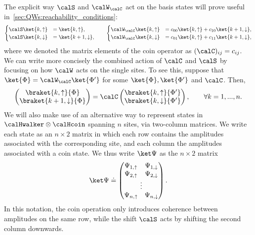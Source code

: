 The explicit way $\calS$ and $\calW_\calC$ act on the basis states will prove useful in~\cref{sec:QWs:reachability_conditions}:
\begin{equation}
\begin{cases}
    \calS\ket{k,\uparrow} &= \ket{k,\uparrow}, \\
    \calS\ket{k,\downarrow} &= \ket{k+1, \downarrow},
\end{cases}
\qquad
\begin{cases}
    \calW_\calC\ket{k,\uparrow} &= c_{00} \ket{k,\uparrow} + c_{10} \ket{k+ 1,\downarrow}, \\
    \calW_\calC\ket{k,\downarrow} &= c_{01}\ket{k, \uparrow} + c_{11} \ket{k+1, \downarrow},
\end{cases}
\end{equation}
where we denoted the matrix elements of the coin operator as $(\calC)_{ij}=c_{ij}$.
We can write more concisely the combined action of $\calC$ and $\calS$ by focusing on how $\calW$ acts on the single sites.
To see this, suppose that $\ket{\Phi}=\calW_\calC\ket{\Phi'}$ for some $\ket{\Phi},\ket{\Phi'}$ and $\calC$.
Then,
\begin{equation}
    \begin{pmatrix}
        \braket{k,\uparrow}{\Phi} \\
        \braket{k + 1, \downarrow}{\Phi}
    \end{pmatrix} =
    \calC \begin{pmatrix}
        \braket{k,\uparrow}{\Phi'} \\
        \braket{k,\downarrow}{\Phi'}
    \end{pmatrix},
    \qquad \forall k=1,...,n.
    \label{eq:QWs:dynamics_on_single_positions}
\end{equation}
We will also make use of an alternative way to represent states in $\calHwalker\otimes\calHcoin$ spanning $n$ sites, via two-column matrices. We write each state as an $n\times 2$ matrix in which each row contains the amplitudes associated with the corresponding site, and each column the amplitudes associated with a coin state.
We thus write $\ket\Psi$ as the $n\times2$ matrix
\begin{equation}
    \ket\Psi\doteq \begin{pmatrix}
        \Psi_{1,\uparrow} & \Psi_{1,\downarrow} \\
        \Psi_{2,\uparrow} & \Psi_{2,\downarrow} \\
        \multicolumn{2}{c}{\vdots} \\ 
        \Psi_{n,\uparrow} & \Psi_{n,\downarrow} \\
    \end{pmatrix}.
    \label{eq:QWs:matrix_notation}
\end{equation}
In this notation, the coin operation only introduces coherence between amplitudes on the same row, while the shift $\calS$ acts by shifting the second column downwards.

